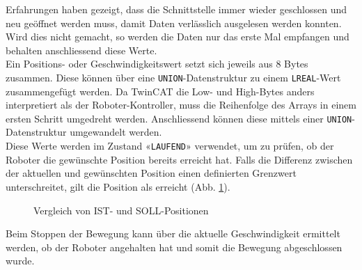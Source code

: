 		Erfahrungen haben gezeigt, dass die Schnittstelle immer wieder geschlossen und neu geöffnet werden muss, damit Daten verlässlich ausgelesen werden konnten. Wird dies nicht gemacht, so werden die Daten nur das erste Mal empfangen und behalten anschliessend diese Werte.
		\\
		Ein Positions- oder Geschwindigkeitswert setzt sich jeweils aus 8 Bytes zusammen. Diese können über eine \verb|UNION|-Datenstruktur zu einem \verb|LREAL|-Wert zusammengefügt werden. Da TwinCAT die Low- und High-Bytes anders interpretiert als der Roboter-Kontroller, muss die Reihenfolge des Arrays in einem ersten Schritt umgedreht werden. Anschliessend können diese mittels einer \verb|UNION|-Datenstruktur umgewandelt werden. 
		\\
		Diese Werte werden im Zustand «\verb|LAUFEND|» verwendet, um zu prüfen, ob der Roboter die gewünschte Position bereits erreicht hat. Falls die Differenz zwischen der aktuellen und gewünschten Position einen definierten Grenzwert unterschreitet, gilt die Position als erreicht (Abb. \ref{fig:Positionsvergleich}).
		
		\newpage
		
		\begin{figure}[h!]
			\centering
			\captionsetup{justification=centering}
			\caption{Vergleich von IST- und SOLL-Positionen}
			\label{fig:Positionsvergleich}
		\end{figure}
		
		Beim Stoppen der Bewegung kann über die aktuelle Geschwindigkeit ermittelt werden, ob der Roboter angehalten hat und somit die Bewegung abgeschlossen wurde.
		\vspace{3mm}
		
